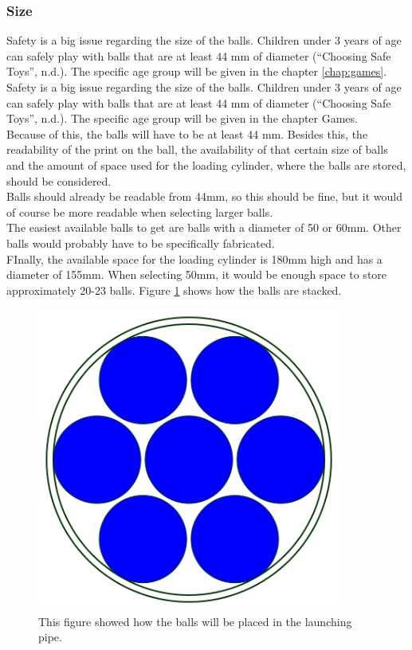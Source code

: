 \documentclass[11pt,twoside,a4paper]{report}
\begin{document}
\subsubsection{Size}
Safety is a big issue regarding the size of the balls. Children under 3 years of age can safely play with balls that are at least 44 mm of diameter (“Choosing Safe Toys”, n.d.). The specific age group will be given in the chapter \ref{chap:games}. \\
Safety is a big issue regarding the size of the balls. Children under 3 years of age can safely play with balls that are at least 44 mm of diameter (“Choosing Safe Toys”, n.d.). The specific age group will be given in the chapter Games.\\
Because of this, the balls will have to be at least 44 mm. Besides this, the readability of the print on the ball, the availability of that certain size of balls and the amount of space used for the loading cylinder, where the balls are stored, should be considered. \\
Balls should already be readable from 44mm, so this should be fine, but it would of course be more readable when selecting larger balls. \\
The easiest available balls to get are balls with a diameter of 50 or 60mm. Other balls would probably have to be specifically fabricated. \\
FInally, the available space for the loading cylinder is 180mm high and has a diameter of 155mm. When selecting 50mm, it would be enough space to store approximately 20-23 balls. Figure \ref{fig:balllaunch} shows how the balls are stacked. \\
\begin{figure}[H]
\begin{center}
\includegraphics[width = 10cm]{Images/BallLaunch.png}
\caption{This figure showed how the balls will be placed in the launching pipe.}
\label{fig:balllaunch}
\end{center}
\end{figure}
\end{document}
